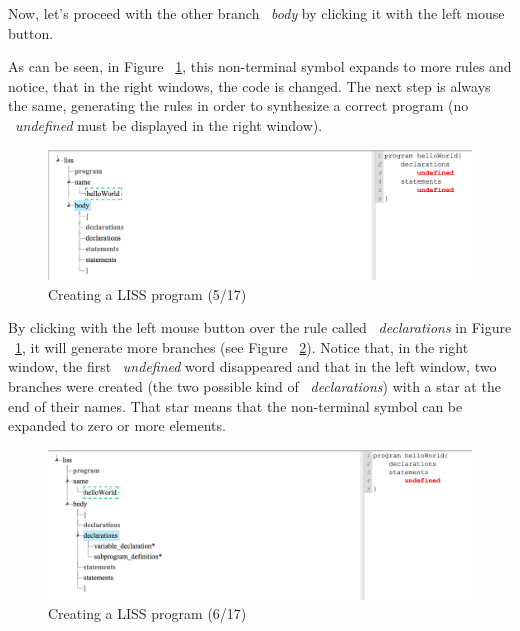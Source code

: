 \documentclass[
  oneside,
  11pt, a4paper,
  footinclude=true,
  headinclude=true,
  cleardoublepage=empty
]{scrbook}
\begin{document}
Now, let's proceed with the other branch ~\textit{body} by clicking it with the left mouse button. 

As can be seen, in Figure ~\ref{fig:LISS-SDE_example_5}, this non-terminal symbol expands to more rules and notice, that in the right windows, the code is changed. The next step is always the same, generating the rules in order to synthesize a correct program (no ~\textit{undefined} must be displayed in the right window).

\begin{figure}[h!]
  \centering
    \includegraphics[width=1\textwidth]{img/LISS-SDE_creating_program/LISS-SDE5.png}
    \caption{Creating a LISS program (5/17)}
    \label{fig:LISS-SDE_example_5}
\end{figure}

By clicking with the left mouse button over the rule called ~\textit{declarations} in Figure ~\ref{fig:LISS-SDE_example_5}, it will generate more branches (see Figure ~\ref{fig:LISS-SDE_example_6}). Notice that, in the right window, the first ~\textit{undefined} word disappeared and that in the left window, two branches were created (the two possible kind of ~\textit{declarations}) with a star at the end of their names. That star means that the non-terminal symbol can be expanded to zero or more elements.

\begin{figure}[h!]
  \centering
    \includegraphics[width=1\textwidth]{img/LISS-SDE_creating_program/LISS-SDE6.png}
    \caption{Creating a LISS program (6/17)}
    \label{fig:LISS-SDE_example_6}
\end{figure}
\end{document}
